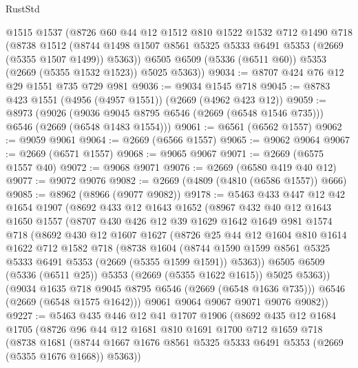 \begin{lexlean}{RustStd}
\begin{coremodule}
      @1515
      @1537
      (@8726
        @60
        @44
        @12
        @1512
        @810
        @1522
        @1532
        @712
        @1490
        @718
        (@8738
          @1512
          (@8744 @1498 @1507 @8561 @5325 @5333 @6491 @5353 (@2669 (@5355 @1507 @1499)) @5363))
        @6505
        @6509
        (@5336 (@6511 @60))
        @5353
        (@2669 (@5355 @1532 @1523))
        @5025
        @5363))
@9034 := @8707 @424 @76 @12 @29 @1551 @735 @729 @981
@9036 := @9034 @1545 @718
@9045 := @8783 @423 @1551 (@4956 (@4957 @1551)) (@2669 (@4962 @423 @12))
@9059 := @8973
    (@9026 (@9036 @9045 @8795 @6546 (@2669 (@6548 @1546 @735))) @6546 (@2669 (@6548 @1483 @1554)))
@9061 := @6561 (@6562 @1557)
@9062 := @9059 @9061
@9064 := @2669 (@6566 @1557)
@9065 := @9062 @9064
@9067 := @2669 (@6571 @1557)
@9068 := @9065 @9067
@9071 := @2669 (@6575 @1557 @40)
@9072 := @9068 @9071
@9076 := @2669 (@6580 @419 @40 @12)
@9077 := @9072 @9076
@9082 := @2669 (@4809 (@4810 (@6586 @1557)) @666)
@9085 := @8962 (@8966 (@9077 @9082))
@9178 := @5463
    @433
    @447
    @12
    @42
    @1654
    @1907
    (@8692
      @433
      @12
      @1643
      @1652
      (@8967
        @432
        @40
        @12
        @1643
        @1650
        @1557
        (@8707
          @430
          @426
          @12
          @39
          @1629
          @1642
          @1649
          @981
          @1574
          @718
          (@8692
            @430
            @12
            @1607
            @1627
            (@8726
              @25
              @44
              @12
              @1604
              @810
              @1614
              @1622
              @712
              @1582
              @718
              (@8738
                @1604
                (@8744 @1590 @1599 @8561 @5325 @5333 @6491 @5353 (@2669 (@5355 @1599 @1591)) @5363))
              @6505
              @6509
              (@5336 (@6511 @25))
              @5353
              (@2669 (@5355 @1622 @1615))
              @5025
              @5363))
          (@9034 @1635 @718 @9045 @8795 @6546 (@2669 (@6548 @1636 @735)))
          @6546
          (@2669 (@6548 @1575 @1642)))
        @9061
        @9064
        @9067
        @9071
        @9076
        @9082))
@9227 := @5463
    @435
    @446
    @12
    @41
    @1707
    @1906
    (@8692
      @435
      @12
      @1684
      @1705
      (@8726
        @96
        @44
        @12
        @1681
        @810
        @1691
        @1700
        @712
        @1659
        @718
        (@8738
          @1681
          (@8744 @1667 @1676 @8561 @5325 @5333 @6491 @5353 (@2669 (@5355 @1676 @1668)) @5363))

\end{coremodule}
\end{lexlean}
